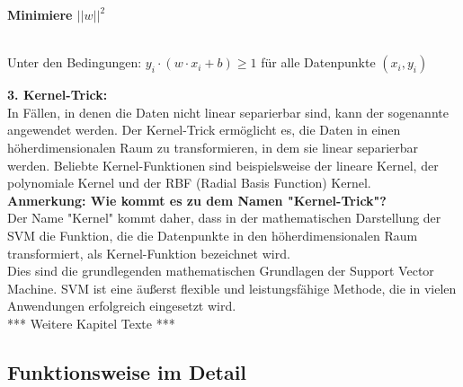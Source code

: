 \documentclass[12pt]{article}
\begin{document}
\begin{center}
\begin{large} \textbf{Minimiere $||w||^2$} \end{large} \\
Unter den Bedingungen: $y_i \cdot (w \cdot x_i + b) \geq 1$ für alle Datenpunkte ${(x_i,y_i)}$
\end{center}
\textbf{3. Kernel-Trick:}\\
In Fällen, in denen die Daten nicht linear separierbar sind, kann der sogenannte  {\color{blue}{Kernel-Trick}}  angewendet werden. Der Kernel-Trick ermöglicht es, die Daten in einen höherdimensionalen Raum zu transformieren, in dem sie linear separierbar werden. Beliebte Kernel-Funktionen sind beispielsweise der lineare Kernel, der polynomiale Kernel und der RBF (Radial Basis Function) Kernel.\\

\textbf{Anmerkung: Wie kommt es zu dem Namen "Kernel-Trick"?}\\
Der Name "Kernel" kommt daher, dass in der mathematischen Darstellung der SVM die Funktion, die die Datenpunkte in den höherdimensionalen Raum transformiert, als Kernel-Funktion bezeichnet wird.\\

Dies sind die grundlegenden mathematischen Grundlagen der Support Vector Machine. SVM ist eine äußerst flexible und leistungsfähige Methode, die in vielen Anwendungen erfolgreich eingesetzt wird.\\

*** Weitere Kapitel Texte *** 

\subsection{Funktionsweise im Detail}
\end{document}
